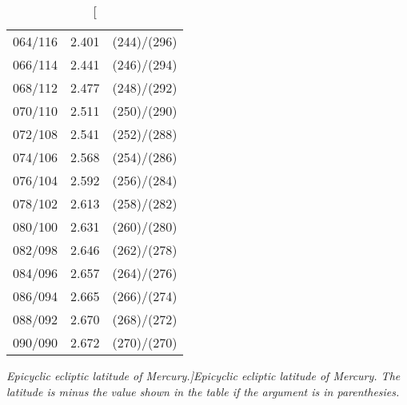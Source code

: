 \begin{table}
{\begin{tabular}{crc}
064/116 &  2.401 & (244)/(296)\\
066/114 &  2.441 & (246)/(294)\\
068/112 &  2.477 & (248)/(292)\\
070/110 &  2.511 & (250)/(290)\\
072/108 &  2.541 & (252)/(288)\\
074/106 &  2.568 & (254)/(286)\\
076/104 &  2.592 & (256)/(284)\\
078/102 &  2.613 & (258)/(282)\\
080/100 &  2.631 & (260)/(280)\\
082/098 &  2.646 & (262)/(278)\\
084/096 &  2.657 & (264)/(276)\\
086/094 &  2.665 & (266)/(274)\\
088/092 &  2.670 & (268)/(272)\\
090/090 &  2.672 & (270)/(270)\\
\end{tabular}}
\caption[\em Epicyclic ecliptic latitude of Mercury.]{\em Epicyclic  ecliptic latitude of Mercury.  The latitude is minus the value shown
in the table if the argument is
in parenthesies. }\label{tlat1mc}
\end{table}

